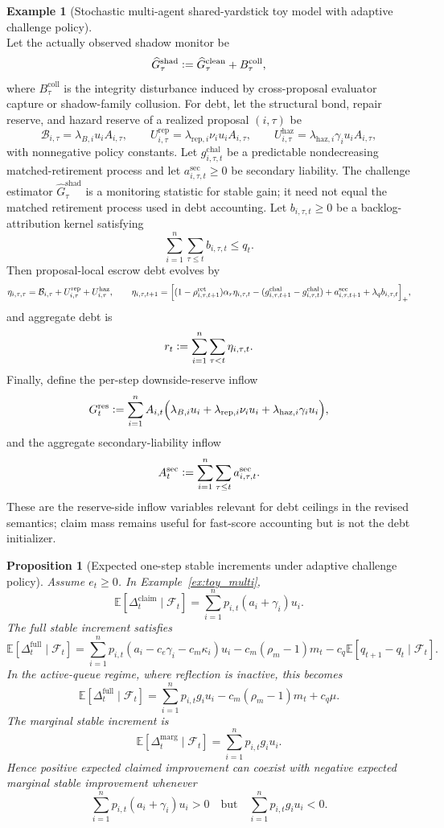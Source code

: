 \documentclass[11pt]{article}
\newtheorem{proposition}[theorem]{Proposition}
\theoremstyle{definition}
\newtheorem{example}[theorem]{Example}
\newcommand{\E}{\mathbb{E}}
\newcommand{\1}{\mathbf{1}}
\newcommand{\Defeq}{\vcentcolon=}
\begin{document}
\begin{example}[Stochastic multi-agent shared-yardstick toy model with adaptive challenge policy]
\[\]
Let the actually observed shadow monitor be
\[
\widehat G_\tau^{\mathrm{shad}}\Defeq \widehat G_\tau^{\mathrm{clean}} + B_\tau^{\mathrm{coll}},
\]
where $B_\tau^{\mathrm{coll}}$ is the integrity disturbance induced by cross-proposal evaluator capture or shadow-family collusion. For debt, let the structural bond, repair reserve, and hazard reserve of a realized proposal $(i,\tau)$ be
\[
\mathcal B_{i,\tau}=\lambda_{B,i}u_iA_{i,\tau},
\qquad
U_{i,\tau}^{\mathrm{rep}}=\lambda_{\mathrm{rep},i}\nu_i u_iA_{i,\tau},
\qquad
U_{i,\tau}^{\mathrm{haz}}=\lambda_{\mathrm{haz},i}\gamma_i u_iA_{i,\tau},
\]
with nonnegative policy constants. Let $g_{i,\tau,t}^{\mathrm{chal}}$ be a predictable nondecreasing matched-retirement process and let $a_{i,\tau,t}^{\mathrm{sec}}\ge 0$ be secondary liability. The challenge estimator $\widehat G_\tau^{\mathrm{shad}}$ is a monitoring statistic for stable gain; it need not equal the matched retirement process used in debt accounting. Let $b_{i,\tau,t}\ge0$ be a backlog-attribution kernel satisfying
\[
\sum_{i=1}^n\sum_{\tau\le t} b_{i,\tau,t}\le q_t.
\]
Then proposal-local escrow debt evolves by
\[
\eta_{i,\tau,\tau}=\mathcal B_{i,\tau}+U_{i,\tau}^{\mathrm{rep}}+U_{i,\tau}^{\mathrm{haz}},
\qquad
\eta_{i,\tau,t+1}
=
\Bigl[
(1-\rho_{i,\tau,t+1}^{\mathrm{ret}})\alpha_r\eta_{i,\tau,t}
-(g_{i,\tau,t+1}^{\mathrm{chal}}-g_{i,\tau,t}^{\mathrm{chal}})
+a_{i,\tau,t+1}^{\mathrm{sec}}
+\lambda_q b_{i,\tau,t}
\Bigr]_+,
\]
and aggregate debt is
\[
r_t\Defeq \sum_{i=1}^n\sum_{\tau<t}\eta_{i,\tau,t}.
\]
Finally, define the per-step downside-reserve inflow
\[
G_t^{\mathrm{res}}
\Defeq
\sum_{i=1}^n
A_{i,t}\Bigl(
\lambda_{B,i}u_i+\lambda_{\mathrm{rep},i}\nu_i u_i+\lambda_{\mathrm{haz},i}\gamma_i u_i
\Bigr),
\]
and the aggregate secondary-liability inflow
\[
A_t^{\mathrm{sec}}\Defeq \sum_{i=1}^n\sum_{\tau\le t} a_{i,\tau,t}^{\mathrm{sec}}.
\]
These are the reserve-side inflow variables relevant for debt ceilings in the revised semantics; claim mass remains useful for fast-score accounting but is not the debt initializer.
\end{example}

\begin{proposition}[Expected one-step stable increments under adaptive challenge policy]\label{prop:toym_increment}
Assume $e_t\ge0$. In Example~\ref{ex:toy_multi},
\[
\E[\Delta_t^{\mathrm{claim}}\mid \mathcal F_t]=\sum_{i=1}^n p_{i,t}(a_i+\gamma_i)u_i.
\]
The full stable increment satisfies
\[
\E[\Delta_t^{\mathrm{full}}\mid \mathcal F_t]
=
\sum_{i=1}^n p_{i,t}(a_i-c_e\gamma_i-c_m\kappa_i)u_i
-c_m(\rho_m-1)m_t
-c_q\E[q_{t+1}-q_t\mid\mathcal F_t].
\]
In the active-queue regime, where reflection is inactive, this becomes
\[
\E[\Delta_t^{\mathrm{full}}\mid \mathcal F_t]
=
\sum_{i=1}^n p_{i,t}g_i u_i
-c_m(\rho_m-1)m_t
+c_q\mu.
\]
The marginal stable increment is
\[
\E[\Delta_t^{\mathrm{marg}}\mid \mathcal F_t]=\sum_{i=1}^n p_{i,t}g_i u_i.
\]
Hence positive expected claimed improvement can coexist with negative expected marginal stable improvement whenever
\[
\sum_{i=1}^n p_{i,t}(a_i+\gamma_i)u_i >0
\quad\text{but}\quad
\sum_{i=1}^n p_{i,t}g_i u_i <0.
\]
\end{proposition}
\end{document}
